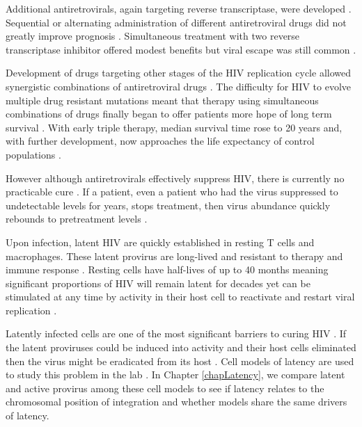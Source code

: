 \documentclass[../sherrill-Mix_thesis.tex]{subfiles}
\begin{document}
	Additional antiretrovirals, again targeting reverse transcriptase, were developed \citep{Vella2012}. Sequential or alternating administration of different antiretroviral drugs did not greatly improve prognosis \citep{Kahn1992,Skowron1993,Abrams1994,deJong1994,Schmit1996a}. Simultaneous treatment with two reverse transcriptase inhibitor offered modest benefits but viral escape was still common \citep{Collier1993,Hammer1996,Eron1995,Saravolatz1996,Darbyshire1996}.

	Development of drugs targeting other stages of the HIV replication cycle allowed synergistic combinations of antiretroviral drugs \citep{Dornsife1991,Johnson1991,Cox1994,Feng2009,Jilek2012,Kulkarni2014}. The difficulty for HIV to evolve multiple drug resistant mutations \citep{Chow1993,Larder1995} meant that therapy using simultaneous combinations of drugs finally began to offer patients more hope of long term survival \citep{Collier1996,Hammer1997,Gulick1997,Montaner1998,Moore1999}. With early triple therapy, median survival time rose to 20 years \citep{AntiretroviralTherapyCohortCollaboration2009,Harrison2010} and, with further development, now approaches the life expectancy of control populations \citep{vanSighem2010,Nakagawa2012,Nakagawa2013,Johnson2013}. 

	However although antiretrovirals effectively suppress HIV, there is currently no practicable cure \citep{Huetter2009,Hayden2013}. If a patient, even a patient who had the virus suppressed to undetectable levels for years, stops treatment, then virus abundance quickly rebounds to pretreatment levels \citep{Davey1999,Hamlyn2012,Stoehr2013}. 
	
	Upon infection, latent HIV are quickly \citep{Chun1998a,Whitney2014} established in resting \cdFour{} T cells and macrophages. These latent provirus are long-lived and resistant to therapy and immune response \citep{Finzi1997,Chun1997}. Resting \cdFour{} cells have half-lives of up to 40 months \citep{Finzi1999,Siliciano2003} meaning significant proportions of HIV will remain latent for decades yet can be stimulated at any time by activity in their host cell to reactivate and restart viral replication \citep{Chun1995, Chun1997,Wong1997,Finzi1999, Davey1999,Hamlyn2012,Stoehr2013}. 

	Latently infected cells are one of the most significant barriers to curing HIV \citep{Richman2009}. If the latent proviruses could be induced into activity and their host cells eliminated then the virus might be eradicated from its host \citep{Archin2009,Kulkosky2001,Xing2011,Wei2014}.  Cell models of latency are used to study this problem in the lab \citep{Lewinski2005,Shan2011,Pace2012}. In Chapter \ref{chapLatency}, we compare latent and active provirus among these cell models to see if latency relates to the chromosomal position of integration and whether models share the same drivers of latency.
	
\end{document}
